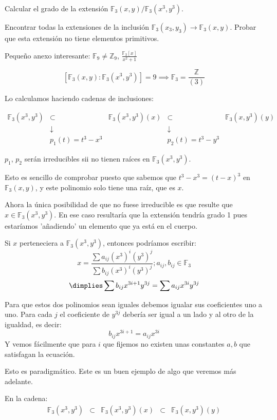 \begin{problem}[3]
\ppart Calcular el grado de la extensión $\mathbb{F}_3(x, y)/\mathbb{F}_3(x^3, y^3)$.

\ppart Encontrar todas la extensiones de la inclusión $\mathbb{F}_3 (x_3 , y_3) → \mathbb{F}_3(x, y)$.
\ppart Probar que esta extensión no tiene elementos primitivos.

\solution

Pequeño anexo interesante: $\mathbb{F}_9 ≠ ℤ_9$, $\frac{\mathbb{F}_3[x]}{x^2+1}$



\spart 
$$[\mathbb{F}_3(x,y) : \mathbb{F}_3(x^3,y^3)] = 9 \implies \mathbb{F}_3 = \frac{ℤ}{(3)}$$


Lo calculamos haciendo cadenas de inclusiones:

$$\begin{array}{ccccc}\mathbb{F}_3(x^3,y^3) &\subset& \mathbb{F}_3(x^3,y^3)(x) &\subset& \mathbb{F}_3(x,y^3)(y)\\
&\downarrow& & \downarrow&\\
&p_1(t) = t^3-x^3& & p_2(t) = t^3-y^3&\end{array}$$

$p_1$, $p_2$ serán irreducibles sii no tienen raíces en $\mathbb{F}_3(x^3,y^3)$.

Esto es sencillo de comprobar puesto que sabemos que $t^3-x^3 = (t-x)^3$ en $\mathbb{F}_3(x,y)$, y este polinomio solo tiene una raíz, que es $x$.

Ahora la única posibilidad de que no fuese irreducible es que resulte que $x\in \mathbb{F}_3(x^3,y^3)$. En ese caso resultaría que la extensión tendría grado 1 pues estaríamos 'añadiendo' un elemento que ya está en el cuerpo.

Si $x$ perteneciera a $\mathbb{F}_3(x^3,y^3)$, entonces podríamos escribir:
\[x = \frac{\sum a_{ij}(x^3)^i(y^3)^j}{\sum b_{ij}(x^3)^i(y^3)^j}; a_{ij},b_{ij} ∈ \mathbb{F}_3\]
\[\dimplies \sum b_{ij} x^{3i+1}y^{3j} = \sum a_{ij} x^{3i}y^{3j}\]

Para que estos dos polinomios sean iguales debemos igualar sus coeficientes uno a uno. Para cada $j$ el coeficiente de $y^{3j}$ debería ser igual a un lado y al otro de la igualdad, es decir:
\[b_{ij}x^{3i+1}=a_{ij}x^{3i}\]
Y vemos fácilmente que para $i$ que fijemos no existen unas constantes $a,b$ que satisfagan la ecuación.

\spart Esto es paradigmático. Este es un buen ejemplo de algo que veremos más adelante.

En la cadena:
$$\begin{array}{ccccc}\mathbb{F}_3(x^3,y^3) &\subset& \mathbb{F}_3(x^3,y^3)(x) &\subset& \mathbb{F}_3(x,y^3)(y)\\
\end{array}$$


\end{problem}
